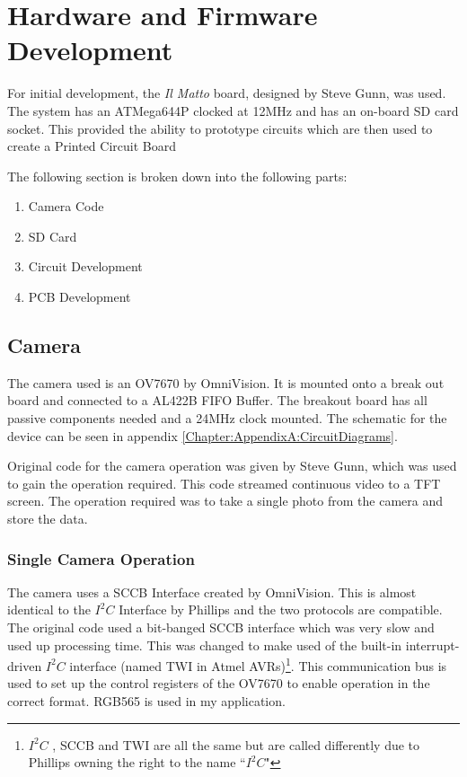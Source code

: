 \chapter{Hardware and Firmware Development} \label{Chapter:HardwareDevelopment}
For initial development, the \textit{Il Matto} board, designed by Steve Gunn, was used. The system has an ATMega644P clocked at 12MHz and has an on-board SD card socket. This provided the ability to prototype circuits which are then used to create a Printed Circuit Board 

The following section is broken down into the following parts:
\begin{enumerate}
\item[\ref{Section:Camera}] Camera Code
\item[\ref{sect:SDCard}] SD Card
\item[\ref{Section:Circuit_Dev}] Circuit Development
\item[\ref{Section:PCB_Dev}] PCB Development
\end{enumerate}

\section{Camera} \label{Section:Camera}

The camera used is an OV7670 by OmniVision. It is mounted onto a break out board and connected to a AL422B FIFO Buffer. The breakout board has all passive components needed and a 24MHz clock mounted. The schematic for the device can be seen in appendix \ref{Chapter:AppendixA:CircuitDiagrams}.

Original code for the camera operation was given by Steve Gunn, which was used to gain the operation required. This code streamed continuous video to a TFT screen. The operation required was to take a single photo from the camera and store the data. 

\subsection{Single Camera Operation}

The camera uses a SCCB Interface \citep{SCCB_Interface} created by OmniVision. This is almost identical to the $I^{2}C$ Interface by Phillips and the two protocols are compatible. The original code used a bit-banged SCCB interface which was very slow and used up processing time. This was changed to make used of the built-in interrupt-driven $I^{2}C$ interface (named TWI in Atmel AVRs)\footnote{$I^{2}C$ , SCCB and TWI are all the same but are called differently due to Phillips owning the right to the name ``$I^{2}C$"}. This communication bus is used to set up the control registers of the OV7670 to enable operation in the correct format. RGB565 is used in my application.

